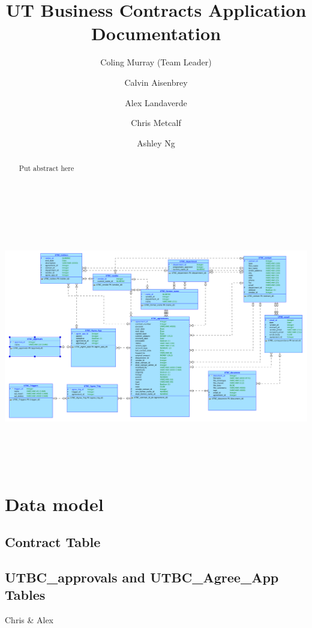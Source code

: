 \documentclass{report}
\begin{document}
\title{\bfseries UT Business Contracts Application Documentation}

\author{
	Coling Murray (Team Leader)
	\and
	Calvin Aisenbrey
	\and
	Alex Landaverde
	\and
	Chris Metcalf
	\and
	Ashley Ng
}

\maketitle

\begin{abstract}
Put abstract here
\end{abstract}

\tableofcontents

\newpage

\begin{image}
\centering
\includegraphics[height = 4.5in, angle = 90]{UTBC_model}
\end{image}



\chapter{Data model}

\section{Contract Table}

\section{UTBC\_approvals and UTBC\_Agree\_App Tables}
Chris & Alex
\end{document}
